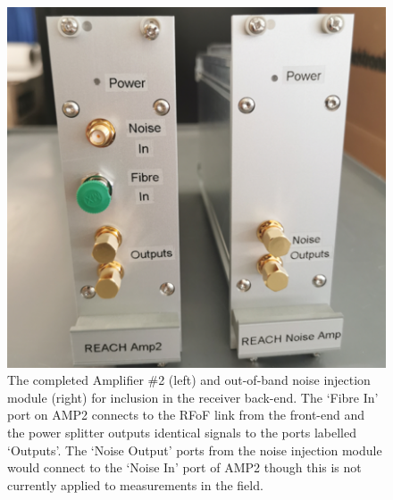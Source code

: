 \begin{figure}
    \centering
    \includegraphics[scale=0.6]{amp2}
    \caption{The completed Amplifier \#2 (left) and out-of-band noise injection module (right) for inclusion in the receiver back-end. The ‘Fibre In’ port on AMP2 connects to the RFoF link from the front-end and the power splitter outputs identical signals to the ports labelled ‘Outputs’. The ‘Noise Output’ ports from the noise injection module would connect to the ‘Noise In’ port of AMP2 though this is not currently applied to measurements in the field.}
    \label{fig:amp2}
\end{figure}


